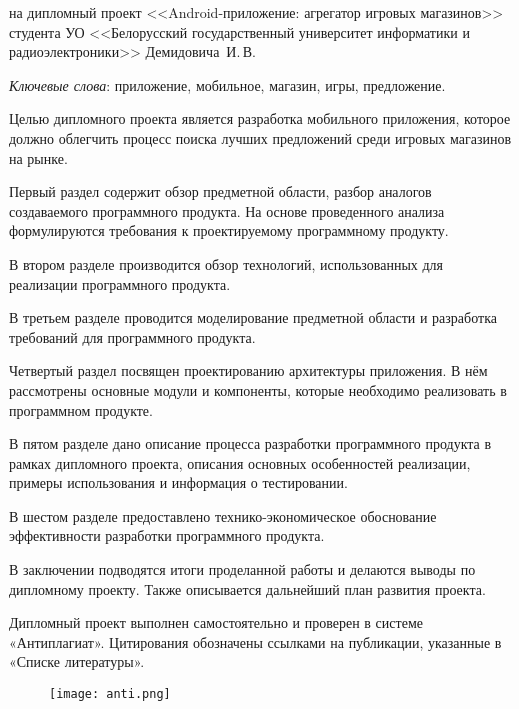 \thispagestyle{empty}

\begin{center}
  \begin{minipage}{0.82\textwidth}
    на дипломный проект <<Android-приложение: агрегатор игровых магазинов>> студента УО <<Белорусский государственный университет информатики и радиоэлектроники>> Демидовича~И.\,В.
  \end{minipage}
\end{center}

\emph{Ключевые слова}: приложение, мобильное, магазин, игры, предложение.
\vspace{1\parsep}

Целью дипломного проекта является разработка мобильного приложения, которое должно облегчить процесс поиска лучших предложений среди игровых магазинов на рынке.

Первый раздел содержит обзор предметной области, разбор аналогов создаваемого программного продукта. На основе проведенного анализа формулируются требования к проектируемому программному продукту.

В втором разделе производится обзор технологий, использованных для реализации программного продукта.

В третьем разделе проводится моделирование предметной области и разработка требований для программного продукта.

Четвертый раздел посвящен проектированию архитектуры приложения. В нём рассмотрены основные модули и компоненты, которые необходимо реализовать в программном продукте.

В пятом разделе дано описание процесса разработки программного продукта в рамках дипломного проекта, описания основных особенностей реализации, примеры использования и информация о тестировании.

В шестом разделе предоставлено технико-экономическое обоснование эффективности разработки программного продукта.

В заключении подводятся итоги проделанной работы и делаются выводы по дипломному проекту. Также описывается дальнейший план развития проекта.

Дипломный проект выполнен самостоятельно и проверен в системе «Антиплагиат». Цитирования обозначены ссылками на публикации, указанные в «Списке литературы».
\begin{figure}[H]
  \centering
    \texttt{[image: anti.png]} 
    \label{fig:anti}
 \end{figure}
\clearpage